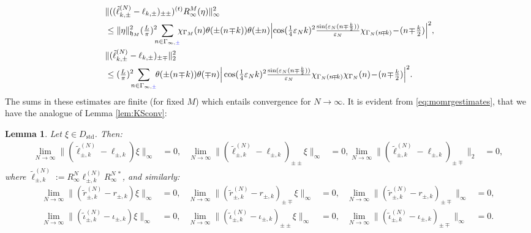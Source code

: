 \documentclass[a4paper, 11pt]{article}
\newcommand{\fh}{\mathfrak{h}}
\DeclareMathOperator{\1}{\mathds{1}}
\DeclareMathOperator{\std}{std}
\newtheorem{lemma}[thm]{Lemma}
\begin{document}
\begin{align}
\label{eq:momrgestimates}
& \|((\tilde{\ell}^{(N)}_{k,\pm}-\ell_{k,\pm})_{\pm\pm})^{(t)}R^{M}_{\infty}(\eta)\|_{\infty}^{2} \\ \nonumber
& \leq \|\eta\|_{\fh_{M}}^{2}(\tfrac{L}{\pi})^{2}\!\!\!\sum_{n\in\Gamma_{\infty,{\color{blue}\pm}}}\!\!\!\chi_{\Gamma_{M}}(n)\theta(\pm(n\!\mp\!k))\theta(\pm n)\Big|\!\cos(\tfrac{1}{4}\vep_{N}k)^{2}\tfrac{\sin(\vep_{N}(n\mp\frac{k}{2}))}{\vep_{N}}\chi_{\Gamma_{N}(n\!\mp\!k)}\!-\!(n\!\mp\!\tfrac{k}{2})\Big|^{2}, \\ \nonumber
& \|(\tilde{\ell}^{(N)}_{k,\pm}-\ell_{k,\pm})_{\pm\mp}\|_{2}^{2} \\ \nonumber
& \leq (\tfrac{L}{\pi})^{2}\!\!\!\sum_{n\in\Gamma_{\infty,{\color{blue}\pm}}}\!\!\theta(\pm(n\!\mp\!k))\theta(\mp n)\Big|\cos(\tfrac{1}{4}\vep_{N}k)^{2}\tfrac{\sin(\vep_{N}(n\mp\frac{k}{2}))}{\vep_{N}}\chi_{\Gamma_{N}(n\!\mp\!k)}\chi_{\Gamma_{N}}(n)\!-\!(n\!\mp\!\tfrac{k}{2})\Big|^{2}.
\end{align}
The sums in these estimates are finite (for fixed $M$) which entails convergence for $N\rightarrow\infty$. It is evident from \eqref{eq:momrgestimates}, that we have the analogue of Lemma \ref{lem:KSconv}:
\begin{lemma}
\label{lem:KSconvc}
Let $\xi\in D_{\std}$. Then:
\begin{align*}
\lim_{N\rightarrow\infty}\|(\tilde{\ell}^{(N)}_{\pm,k}\!-\!\ell_{\pm,k})\xi\|_{\infty} & = 0, & \lim_{N\rightarrow\infty}\|(\tilde{\ell}^{(N)}_{\pm,k}\!-\!\ell_{\pm,k})_{\pm\pm}\xi\|_{\infty} & = 0, \lim_{N\rightarrow\infty}\|(\tilde{\ell}^{(N)}_{\pm,k}\!-\!\ell_{\pm,k})_{\pm\mp}\|_{2} & = 0,
\end{align*}
where $\tilde{\ell}^{(N)}_{\pm,k}:=R^{N}_{\infty}\ell^{(N)}_{\pm,k}R^{N\!\ *}_{\infty}$, and similarly:
\begin{align*}
\lim_{N\rightarrow\infty}\|(\tilde{r}^{(N)}_{\pm,k}\!-\!r_{\pm,k})\xi\|_{\infty} & = 0, & \lim_{N\rightarrow\infty}\|(\tilde{r}^{(N)}_{\pm,k}\!-\!r_{\pm,k})_{\pm\mp}\xi\|_{\infty} & = 0, & \lim_{N\rightarrow\infty}\|(\tilde{r}^{(N)}_{\pm,k}\!-\!r_{\pm,k})_{\pm\mp}\|_{\infty} & = 0, \\
\lim_{N\rightarrow\infty}\|(\tilde{\iota}^{(N)}_{\pm,k}\!-\!\iota_{\pm,k})\xi\|_{\infty} & = 0, & \lim_{N\rightarrow\infty}\|(\tilde{\iota}^{(N)}_{\pm,k}\!-\!\iota_{\pm,k})_{\pm\pm}\xi\|_{\infty} & = 0, & \lim_{N\rightarrow\infty}\|(\tilde{\iota}^{(N)}_{\pm,k}\!-\!\iota_{\pm,k})_{\pm\mp}\|_{\infty} & = 0.
\end{align*} 
\end{lemma}
\end{document}
